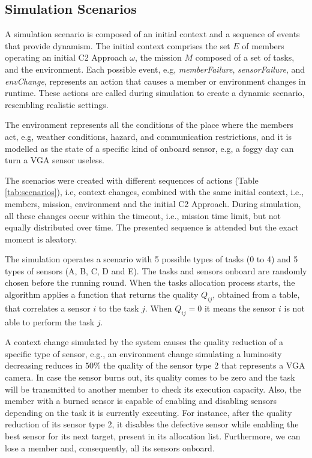 \subsection{Simulation Scenarios}
\label{sub:scenarios}

A simulation scenario is composed of an initial context and a sequence of events that provide dynamism. The initial context comprises the set $E$ of members operating an initial C2 Approach $\omega$, the mission $M$ composed of a set of tasks, and the environment. Each possible event, e.g, \textit{memberFailure}, \textit{sensorFailure}, and \textit{envChange}, represents an action that causes a member or environment changes in runtime. These actions are called during simulation to create a dynamic scenario, resembling realistic settings.

The environment represents all the conditions of the place where the members act, e.g, weather conditions, hazard, and communication restrictions, and it is modelled as the state of a specific kind of onboard sensor, e.g, a foggy day can turn a VGA sensor useless.

The scenarios were created with different sequences of actions (Table \ref{tab:scenarios}), i.e, context changes, combined with the same initial context, i.e., members, mission, environment and the initial C2 Approach. During simulation, all these changes occur within the timeout, i.e., mission time limit, but not equally distributed over time. The presented sequence is attended but the exact moment is aleatory.



The simulation operates a scenario with 5 possible types of tasks (0 to 4) and 5 types of sensors (A, B, C, D and E). The tasks and sensors onboard are randomly chosen before the running round. When the tasks allocation process starts, the algorithm applies a function that returns the quality $Q_{ij}$, obtained from a table, that correlates a sensor $i$ to the task $j$. When $Q_{ij}=0$ it means the sensor $i$ is not able to perform the task $j$.

A context change simulated by the system causes the quality reduction of a specific type of sensor, e.g., an environment change simulating a luminosity decreasing reduces in $50\%$ the quality of the sensor type 2 that represents a VGA camera. In case the sensor burns out, its quality comes to be zero and the task will be transmitted to another member to check its execution capacity. Also, the member with a burned sensor is capable of enabling and disabling sensors depending on the task it is currently executing. For instance, after the quality reduction of its sensor type 2, it disables the defective sensor while enabling the best sensor for its next target, present in its allocation list. Furthermore, we can lose a member and, consequently, all its sensors onboard.

